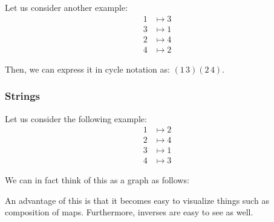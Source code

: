 \documentclass[openany]{book}
\begin{document}
Let us consider another example:
\begin{align*}
	1 &\mapsto 3 \\
	3 &\mapsto 1 \\
	2 &\mapsto 4 \\
	4 &\mapsto 2
\end{align*}

Then, we can express it in cycle notation as: $(1 \, 3)(2 \, 4)$.

\subsubsection{Strings}
Let us consider the following example:
\begin{align*}
	1 &\mapsto 2 \\
	2 &\mapsto 4 \\
	3 &\mapsto 1 \\
	4 &\mapsto 3
\end{align*}

We can in fact think of this as a graph as follows:
\begin{center}
\end{center}

An advantage of this is that it becomes easy to visualize things such as composition of maps. Furthermore, inverses are easy to see as well.
\end{document}
